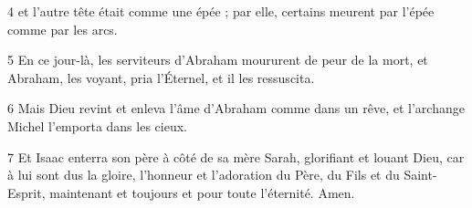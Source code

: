 \par 4 et l'autre tête était comme une épée ; par elle, certains meurent par l'épée comme par les arcs.

\par 5 En ce jour-là, les serviteurs d'Abraham moururent de peur de la mort, et Abraham, les voyant, pria l'Éternel, et il les ressuscita.

\par 6 Mais Dieu revint et enleva l'âme d'Abraham comme dans un rêve, et l'archange Michel l'emporta dans les cieux.

\par 7 Et Isaac enterra son père à côté de sa mère Sarah, glorifiant et louant Dieu, car à lui sont dus la gloire, l'honneur et l'adoration du Père, du Fils et du Saint-Esprit, maintenant et toujours et pour toute l'éternité. Amen.

